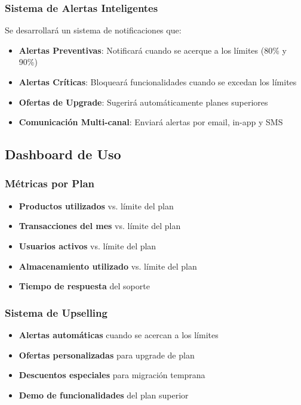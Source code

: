 \documentclass[12pt,a4paper]{article}
\begin{document}
\subsubsection{Sistema de Alertas Inteligentes}

Se desarrollará un sistema de notificaciones que:

\begin{itemize}
    \item \textbf{Alertas Preventivas}: Notificará cuando se acerque a los límites (80\% y 90\%)
    \item \textbf{Alertas Críticas}: Bloqueará funcionalidades cuando se excedan los límites
    \item \textbf{Ofertas de Upgrade}: Sugerirá automáticamente planes superiores
    \item \textbf{Comunicación Multi-canal}: Enviará alertas por email, in-app y SMS
\end{itemize}

\subsection{Dashboard de Uso}

\subsubsection{Métricas por Plan}

\begin{itemize}
    \item \textbf{Productos utilizados} vs. límite del plan
    \item \textbf{Transacciones del mes} vs. límite del plan
    \item \textbf{Usuarios activos} vs. límite del plan
    \item \textbf{Almacenamiento utilizado} vs. límite del plan
    \item \textbf{Tiempo de respuesta} del soporte
\end{itemize}

\subsubsection{Sistema de Upselling}

\begin{itemize}
    \item \textbf{Alertas automáticas} cuando se acercan a los límites
    \item \textbf{Ofertas personalizadas} para upgrade de plan
    \item \textbf{Descuentos especiales} para migración temprana
    \item \textbf{Demo de funcionalidades} del plan superior
\end{itemize}
\end{document}
